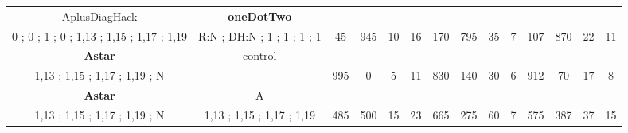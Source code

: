 \begin{table}[]
{\begin{tabular}{|c|c|c|c|c|c|c|c|c|c|c|c|c|c|}
AplusDiagHack & \cellcolor{blue!15}\textbf{oneDotTwo}& {\color[HTML]{00009B} } & {\color[HTML]{9A0000} } & {\color[HTML]{009901} } &  & {\color[HTML]{00009B} } & {\color[HTML]{9A0000} } & {\color[HTML]{009901} } &  & {\color[HTML]{00009B} } & {\color[HTML]{9A0000} } & {\color[HTML]{009901} } &  \\ 
0 ; 0 ; 1 ; 0 ; 1,13 ; 1,15 ; 1,17 ; 1,19 & \cellcolor{ blue!15}R:N ; DH:N ; 1 ; 1 ; 1 ; 1 & \multirow{-2}{*}{{\color[HTML]{00009B} 45}} & \multirow{-2}{*}{{\color[HTML]{9A0000} 945}} & \multirow{-2}{*}{{\color[HTML]{009901} 10}} & \multirow{-2}{*}{16} & \multirow{-2}{*}{{\color[HTML]{00009B} 170}} & \multirow{-2}{*}{{\color[HTML]{9A0000} 795}} & \multirow{-2}{*}{{\color[HTML]{009901} 35}} & \multirow{-2}{*}{7} & \multirow{-2}{*}{{\color[HTML]{00009B} 107}} & \multirow{-2}{*}{{\color[HTML]{9A0000} 870}} & \multirow{-2}{*}{{\color[HTML]{009901} 22}} & \multirow{-2}{*}{11} \\ \hline

\cellcolor{blue!15}\textbf{Astar} & control& {\color[HTML]{00009B} } & {\color[HTML]{9A0000} } & {\color[HTML]{009901} } &  & {\color[HTML]{00009B} } & {\color[HTML]{9A0000} } & {\color[HTML]{009901} } &  & {\color[HTML]{00009B} } & {\color[HTML]{9A0000} } & {\color[HTML]{009901} } &  \\ 
\cellcolor{ blue!15}1,13 ; 1,15 ; 1,17 ; 1,19 ; N &  & \multirow{-2}{*}{{\color[HTML]{00009B} 995}} & \multirow{-2}{*}{{\color[HTML]{9A0000} 0}} & \multirow{-2}{*}{{\color[HTML]{009901} 5}} & \multirow{-2}{*}{11} & \multirow{-2}{*}{{\color[HTML]{00009B} 830}} & \multirow{-2}{*}{{\color[HTML]{9A0000} 140}} & \multirow{-2}{*}{{\color[HTML]{009901} 30}} & \multirow{-2}{*}{6} & \multirow{-2}{*}{{\color[HTML]{00009B} 912}} & \multirow{-2}{*}{{\color[HTML]{9A0000} 70}} & \multirow{-2}{*}{{\color[HTML]{009901} 17}} & \multirow{-2}{*}{8} \\ \hline

\cellcolor{blue!15}\textbf{Astar} & A& {\color[HTML]{00009B} } & {\color[HTML]{9A0000} } & {\color[HTML]{009901} } &  & {\color[HTML]{00009B} } & {\color[HTML]{9A0000} } & {\color[HTML]{009901} } &  & {\color[HTML]{00009B} } & {\color[HTML]{9A0000} } & {\color[HTML]{009901} } &  \\ 
\cellcolor{ blue!15}1,13 ; 1,15 ; 1,17 ; 1,19 ; N & 1,13 ; 1,15 ; 1,17 ; 1,19 & \multirow{-2}{*}{{\color[HTML]{00009B} 485}} & \multirow{-2}{*}{{\color[HTML]{9A0000} 500}} & \multirow{-2}{*}{{\color[HTML]{009901} 15}} & \multirow{-2}{*}{23} & \multirow{-2}{*}{{\color[HTML]{00009B} 665}} & \multirow{-2}{*}{{\color[HTML]{9A0000} 275}} & \multirow{-2}{*}{{\color[HTML]{009901} 60}} & \multirow{-2}{*}{7} & \multirow{-2}{*}{{\color[HTML]{00009B} 575}} & \multirow{-2}{*}{{\color[HTML]{9A0000} 387}} & \multirow{-2}{*}{{\color[HTML]{009901} 37}} & \multirow{-2}{*}{15} \\ \hline


\end{tabular}}
\end{table}
